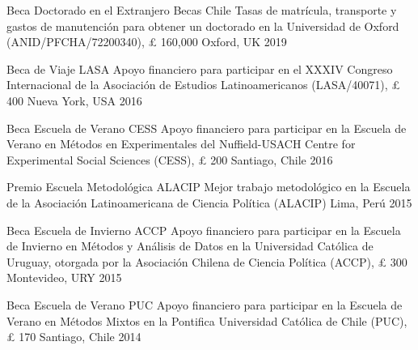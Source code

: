 \vspace{1mm}

\begin{cvhonors}
\cvhonor
{Beca Doctorado en el Extranjero Becas Chile} 
{Tasas de matrícula, transporte y gastos de manutención para obtener un doctorado en la Universidad de Oxford (ANID/PFCHA/72200340), {\pounds} 160,000}
{Oxford, UK}
{2019}
\end{cvhonors}

\vspace{1mm}

\begin{cvhonors}
\cvhonor
{Beca de Viaje LASA} 
{Apoyo financiero para participar en el XXXIV Congreso Internacional de la Asociación de Estudios Latinoamericanos (LASA/40071), {\pounds} 400}
{Nueva York, USA}
{2016}
\end{cvhonors}

\vspace{1mm}

\begin{cvhonors}
\cvhonor
{Beca Escuela de Verano CESS}
{Apoyo financiero para participar en la Escuela de Verano en Métodos en Experimentales del Nuffield-USACH Centre for Experimental Social Sciences (CESS), {\pounds} 200}
{Santiago, Chile}
{2016}
\end{cvhonors}

\vspace{1mm}

\begin{cvhonors}
\cvhonor
{Premio Escuela Metodológica ALACIP}
{Mejor trabajo metodológico en la Escuela de la Asociación Latinoamericana de Ciencia Política (ALACIP)}
{Lima, Perú}
{2015}
\end{cvhonors}

\vspace{1mm}

\begin{cvhonors}
\cvhonor
{Beca Escuela de Invierno ACCP}
{Apoyo financiero para participar en la Escuela de Invierno en Métodos y Análisis de Datos en la Universidad Cat\'olica de Uruguay, otorgada por la Asociación Chilena de Ciencia Política (ACCP), {\pounds} 300}
{Montevideo, URY}
{ 2015}
\end{cvhonors}

\vspace{1mm}

\begin{cvhonors}
\cvhonor
{Beca Escuela de Verano PUC}
{Apoyo financiero para participar en la Escuela de Verano en Métodos Mixtos en la Pontifica Universidad Cat\'olica de Chile (PUC), {\pounds} 170}
{Santiago, Chile}
{2014} 
\end{cvhonors}

